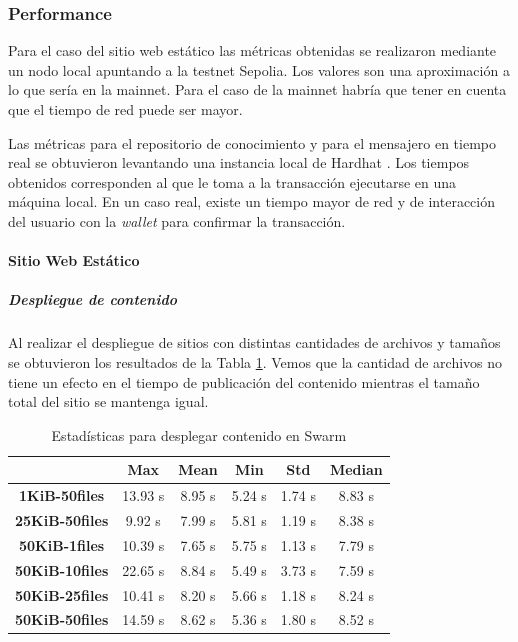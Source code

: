 \subsubsection{Performance\label{performance-blockchain}}

Para el caso del sitio web estático las métricas obtenidas se realizaron mediante un nodo local apuntando a la testnet Sepolia. Los valores son una aproximación a lo que sería en la mainnet. Para el caso de la mainnet habría que tener en cuenta que el tiempo de red puede ser mayor.

Las métricas para el repositorio de conocimiento y para el mensajero en tiempo real se obtuvieron levantando una instancia local de Hardhat \cite{hardhat}. Los tiempos obtenidos corresponden al que le toma a la transacción ejecutarse en una máquina local. En un caso real, existe un tiempo mayor de red y de interacción del usuario con la \textit{wallet} para confirmar la transacción.

\paragraph{Sitio Web Estático}

\subparagraph{Despliegue de contenido}

Al realizar el despliegue de sitios con distintas cantidades de archivos y tamaños se obtuvieron los resultados de la Tabla \ref{table:estadisticas-despliegue-swarm}. Vemos que la cantidad de archivos no tiene un efecto en el tiempo de publicación del contenido mientras el tamaño total del sitio se mantenga igual.

\setlength\tabcolsep{10pt}
\begin{table}[H]
    \centering
    \begin{tabular}{|c|c|c|c|c|c|}
    \hline
    & \textbf{Max} & \textbf{Mean} & \textbf{Min} & \textbf{Std} & \textbf{Median} \\
    \hline
    \textbf{1KiB-50files} & 13.93 s & 8.95 s & 5.24 s & 1.74 s & 8.83 s \\
    \hline
    \textbf{25KiB-50files} & 9.92 s & 7.99 s & 5.81 s & 1.19 s & 8.38 s \\
    \hline
    \textbf{50KiB-1files} & 10.39 s & 7.65 s & 5.75 s & 1.13 s & 7.79 s \\
    \hline
    \textbf{50KiB-10files} & 22.65 s & 8.84 s & 5.49 s & 3.73 s & 7.59 s \\
    \hline
    \textbf{50KiB-25files} & 10.41 s & 8.20 s & 5.66 s & 1.18 s & 8.24 s \\
    \hline
    \textbf{50KiB-50files} & 14.59 s & 8.62 s & 5.36 s & 1.80 s & 8.52 s \\
    \hline
    \end{tabular}
    \caption{Estadísticas para desplegar contenido en Swarm}
    \label{table:estadisticas-despliegue-swarm}
\end{table}

